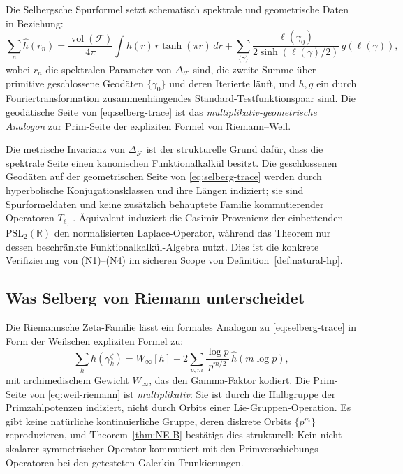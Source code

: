 \documentclass[11pt]{article}
\theoremstyle{definition}
\theoremstyle{remark}
\newcommand{\PSL}{\mathrm{PSL}}
\begin{document}
Die Selbergsche Spurformel \cite{Selberg1956} setzt schematisch spektrale und geometrische
Daten in Beziehung:
\begin{equation}
\label{eq:selberg-trace}
  \sum_n \widehat{h}(r_n)
  = \frac{\operatorname{vol}(\mathcal{F})}{4\pi} \int h(r)\,r\tanh(\pi r)\,dr
  + \sum_{\{\gamma\}} \frac{\ell(\gamma_0)}{2\sinh(\ell(\gamma)/2)}\,
      g(\ell(\gamma)),
\end{equation}
wobei $r_n$ die spektralen Parameter von $\Delta_\mathcal{F}$ sind, die
zweite Summe über primitive geschlossene Geodäten $\{\gamma_0\}$ und deren
Iterierte läuft, und $h, g$ ein durch Fouriertransformation zusammenhängendes
Standard-Testfunktionspaar sind. Die geodätische Seite von \eqref{eq:selberg-trace}
ist das \emph{multiplikativ-geometrische Analogon} zur Prim-Seite der expliziten Formel
von Riemann--Weil.

Die metrische Invarianz von $\Delta_\mathcal{F}$ ist der strukturelle
Grund dafür, dass die spektrale Seite einen kanonischen Funktionalkalkül
besitzt. Die geschlossenen Geodäten auf der geometrischen Seite von
\eqref{eq:selberg-trace} werden durch hyperbolische Konjugationsklassen
und ihre Längen indiziert; sie sind Spurformeldaten und keine zusätzlich
behauptete Familie kommutierender Operatoren $T_{\ell_\gamma}$
\cite{Selberg1956,Marklof2008}. Äquivalent induziert die Casimir-Provenienz
der einbettenden $\PSL_2(\mathbb{R})$ den normalisierten Laplace-Operator,
während das Theorem nur dessen beschränkte Funktionalkalkül-Algebra nutzt.
Dies ist die konkrete Verifizierung von (N1)--(N4) im sicheren Scope von
Definition~\ref{def:natural-hp}.

\subsection{Was Selberg von Riemann unterscheidet}
\label{sec:selberg-vs-riemann}

Die Riemannsche Zeta-Familie lässt ein formales Analogon zu \eqref{eq:selberg-trace}
in Form der Weilschen expliziten Formel zu:
\begin{equation}
\label{eq:weil-riemann}
  \sum_k h(\gamma_k^\zeta)
  = W_\infty[h]
  - 2\sum_{p,m} \frac{\log p}{p^{m/2}}\,\widehat{h}(m\log p),
\end{equation}
mit archimedischem Gewicht $W_\infty$, das den Gamma-Faktor kodiert. Die
Prim-Seite von \eqref{eq:weil-riemann} ist \emph{multiplikativ}: Sie ist
durch die Halbgruppe der Primzahlpotenzen indiziert, nicht durch Orbits einer
Lie-Gruppen-Operation. Es gibt keine natürliche kontinuierliche Gruppe,
deren diskrete Orbits $\{p^m\}$ reproduzieren, und Theorem~\ref{thm:NE-B} bestätigt
dies strukturell: Kein nicht-skalarer symmetrischer Operator kommutiert mit
den Primverschiebungs-Operatoren bei den getesteten Galerkin-Trunkierungen.
\end{document}
